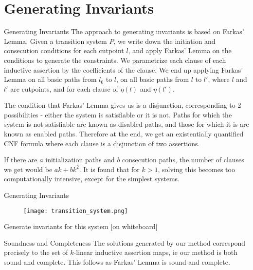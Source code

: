 \documentclass{beamer}
\begin{document}
    \section{Generating Invariants}
    {
        \begin{frame}{Generating Invariants}
            The approach to generating invariants is based on Farkas' Lemma. Given a transition system $P$, we write down the initiation and consecution conditions for each cutpoint $l$, and apply Farkas' Lemma on the conditions to generate the constraints. We parametrize each clause of each inductive assertion by the coefficients of the clause. We end up applying Farkas' Lemma on all basic paths from $l_{0}$ to $l$, on all basic paths from $l$ to $l'$, where $l$ and $l'$ are cutpoints, and for each clause of $\eta(l)$ and $\eta(l')$.

            The condition that Farkas' Lemma gives us is a disjunction, corresponding to 2 possibilities - either the system is satisfiable or it is not. Paths for which the system is not satisfiable are known as disabled paths, and those for which it is are known as enabled paths. Therefore at the end, we get an existentially quantified CNF formula where each clause is a disjunction of two assertions. 

            If there are $a$ initialization paths and $b$ consecution paths, the number of clauses we get would be $ak + bk^2$. It is found that for $k > 1$, solving this becomes too computationally intensive, except for the simplest systems.
        \end{frame}
        \begin{frame}{Generating Invariants}
            \begin{figure}[h!]
                \texttt{[image: transition\_system.png]}
            \end{figure}
            \begin{center}
                Generate invariants for this system [on whiteboard]
            \end{center}
        \end{frame}
        \begin{frame}{Soundness and Completeness}
            The solutions generated by our method correspond precisely to the set of $k$-linear inductive assertion maps, ie our method is both sound and complete. This follows as Farkas' Lemma is sound and complete.
        \end{frame}
    }
\end{document}
